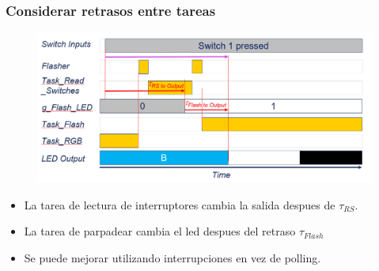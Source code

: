 \documentclass[10.5pt,scale=1.0,t,aspectratio=169,hyperref={pdfpagelabels=false}]{beamer}
\begin{document}
\begin{frame}
	\frametitle{Considerar retrasos entre tareas}
	\begin{figure}
		\centering
		\includegraphics[scale=0.4]{07_TimingDelay2}
	\end{figure}
	\begin{itemize}
		\item La tarea de lectura de interruptores cambia la salida despues de $\tau_{RS}$.
		\item La tarea de parpadear cambia el led despues del retraso $\tau_{Flash}$
		\item Se puede mejorar utilizando interrupciones en vez de polling. 
	\end{itemize}
\end{frame}
\end{document}
